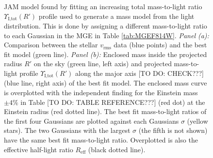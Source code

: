 \begin{figure}
\caption{JAM model found by fitting an increasing total mass-to-light ratio $\Upsilon_\text{I,tot}(R')$ profile used to generate a mass model from the light distribution.  This is done by assigning a different mass-to-light ratio to each Gaussian in the MGE in Table \ref{tab:MGEF814W}. \emph{Panel (a):} Comparison between the stellar $v_\text{rms}$ data (blue points) and the best fit model (green line). \emph{Panel (b):} Enclosed mass inside the projected radius $R'$ on the sky (green line, left axis) and projected mass-to-light profile $\Upsilon_\text{I,tot}(R')$ along the major axis [TO DO: CHECK???] (blue line, right axis) of the best fit model. The enclosed mass curve is overplotted with the independent finding for the Einstein mass $\pm 4 \%$ in Table [TO DO: TABLE REFERENCE???] (red dot) at the Einstein radius (red dotted line). The best fit mass-to-light ratios of the first four Gaussians are plotted against each Gaussians $\sigma$ (yellow stars). The two Gaussians with the largest $\sigma$ (the fifth is not shown) have the same best fit mass-to-light ratio. Overplotted is also the effective half-light ratio $R_\text{eff}$ (black dotted line).}
\label{fig:modelG}
\end{figure}

